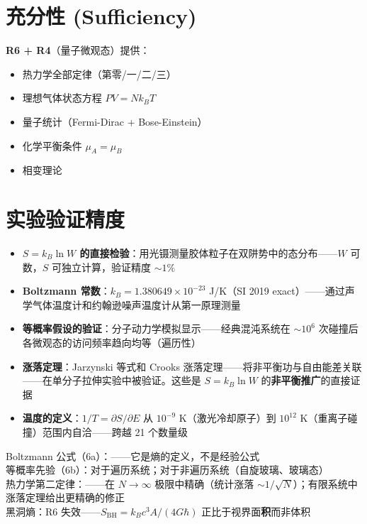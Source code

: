 \section{充分性 (Sufficiency)}

\textbf{R6 + R4}（量子微观态）提供：
\begin{itemize}
  \item 热力学全部定律（第零/一/二/三）
  \item 理想气体状态方程 $PV = Nk_B T$
  \item 量子统计（Fermi-Dirac + Bose-Einstein）
  \item 化学平衡条件 $\mu_A = \mu_B$
  \item 相变理论
\end{itemize}

\section*{实验验证精度}

\begin{oombox}
  \begin{itemize}
    \item \textbf{$S = k_B\ln W$ 的直接检验}：用光镊测量胶体粒子在双阱势中的态分布——$W$ 可数，$S$ 可独立计算，验证精度 $\sim 1\%$
    \item \textbf{Boltzmann 常数}：$k_B = 1.380649\times 10^{-23}$ J/K（SI 2019 exact）——通过声学气体温度计和约翰逊噪声温度计从第一原理测量
    \item \textbf{等概率假设的验证}：分子动力学模拟显示——经典混沌系统在 $\sim 10^6$ 次碰撞后各微观态的访问频率趋向均等（遍历性）
    \item \textbf{涨落定理}：Jarzynski 等式和 Crooks 涨落定理——将非平衡功与自由能差关联——在单分子拉伸实验中被验证。这些是 $S = k_B\ln W$ 的\textbf{非平衡推广}的直接证据
    \item \textbf{温度的定义}：$1/T = \partial S/\partial E$ 从 $10^{-9}$ K（激光冷却原子）到 $10^{12}$ K（重离子碰撞）范围内自洽——跨越 21 个数量级
  \end{itemize}
\end{oombox}

\precisionbox[R6 精度等级]
  Boltzmann 公式（6a）：\precexact ——它是熵的定义，不是经验公式\\
  等概率先验（6b）：\precexact 对于遍历系统；\precqualitative 对于非遍历系统（自旋玻璃、玻璃态）\\
  热力学第二定律：\preceffective ——在 $N \to \infty$ 极限中精确（统计涨落 $\sim 1/\sqrt{N}$）；有限系统中涨落定理给出更精确的修正\\
  黑洞熵：R6 失效——$S_{\text{BH}} = k_B c^3 A/(4G\hbar)$ 正比于视界面\textbf{积}而非体积
\endprecisionbox

